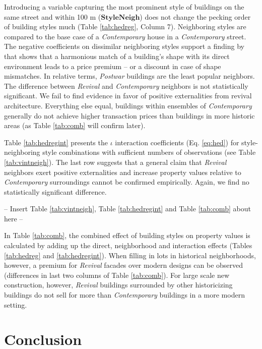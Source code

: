\documentclass[]{article}
\begin{document}
Introducing a variable capturing the most prominent style of buildings
on the same street and within 100 m (\(\mathbf{StyleNeigh}\)) does not
change the pecking order of building styles much (Table
\ref{tab:hedreg}, Column 7). Neighboring styles are compared to the base
case of a \emph{Contemporary} house in a \emph{Contemporary} street. The
negative coefficients on dissimilar neighboring styles support a finding
by \textcite{Lindenthal2017} that shows that a harmonious match of a
building's shape with its direct environment leads to a price premium --
or a discount in case of shape mismatches. In relative terms,
\emph{Postwar} buildings are the least popular neighbors. The difference
between \emph{Revival} and \emph{Contemporary} neighbors is not
statistically significant. We fail to find evidence in favor of positive
externalities from revival architecture. Everything else equal,
buildings within ensembles of \emph{Contemporary} generally do not
achieve higher transaction prices than buildings in more historic areas
(as Table \ref{tab:comb} will confirm later).

Table \ref{tab:hedregint} presents the \(\iota\) interaction
coefficients (Eq. \ref{eq:hed}) for style-neighboring style combinations
with sufficient numbers of observations (see Table \ref{tab:vintneigh}).
The last row suggests that a general claim that \emph{Revival} neighbors
exert positive externalities and increase property values relative to
\emph{Contemporary} surroundings cannot be confirmed empirically. Again,
we find no statistically significant difference.

\begin{center}
  -- Insert  Table \ref{tab:vintneigh}, Table \ref{tab:hedregint} and Table \ref{tab:comb} about here --
\end{center}

In Table \ref{tab:comb}, the combined effect of building styles on
property values is calculated by adding up the direct, neighborhood and
interaction effects (Tables \ref{tab:hedreg} and \ref{tab:hedregint}).
When filling in lots in historical neighborhoods, however, a premium for
\emph{Revival} facades over modern designs can be observed (differences
in last two columns of Table \ref{tab:comb}). For large scale new
construction, however, \emph{Revival} buildings surrounded by other
historicizing buildings do not sell for more than \emph{Contemporary}
buildings in a more modern setting.

\hypertarget{conclusion}{%
\section{Conclusion}\label{conclusion}}
\end{document}

